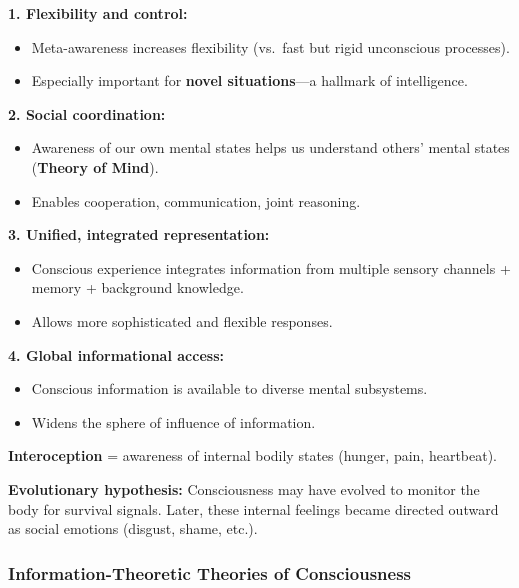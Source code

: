 \begin{defbox}
\textbf{1. Flexibility and control:}
\begin{itemize}
  \item Meta-awareness increases flexibility (vs.\ fast but rigid unconscious processes).
  \item Especially important for \textbf{novel situations}---a hallmark of intelligence.
\end{itemize}

\textbf{2. Social coordination:}
\begin{itemize}
  \item Awareness of our own mental states helps us understand others' mental states (\textbf{Theory of Mind}).
  \item Enables cooperation, communication, joint reasoning.
\end{itemize}

\textbf{3. Unified, integrated representation:}
\begin{itemize}
  \item Conscious experience integrates information from multiple sensory channels + memory + background knowledge.
  \item Allows more sophisticated and flexible responses.
\end{itemize}

\textbf{4. Global informational access:}
\begin{itemize}
  \item Conscious information is available to diverse mental subsystems.
  \item Widens the sphere of influence of information.
\end{itemize}
\end{defbox}

\begin{tipbox}
\textbf{Interoception} = awareness of internal bodily states (hunger, pain, heartbeat).

\textbf{Evolutionary hypothesis:} Consciousness may have evolved to monitor the body for survival signals. Later, these internal feelings became directed outward as social emotions (disgust, shame, etc.).
\end{tipbox}

\bigseparator

\subsubsection{Information-Theoretic Theories of Consciousness}

